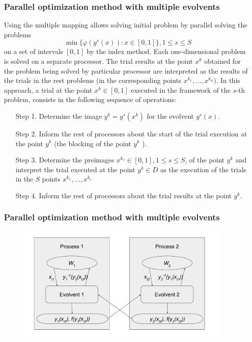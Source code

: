 \documentclass[aspectratio=1610]{beamer}
\begin{document}
\begin{frame}
  \frametitle{Parallel optimization method with multiple evolvents}
  Using the multiple mapping allows solving initial problem by parallel solving the problems
  \[
  \min\{\varphi(y^s(x)):x\in [0,1]\}, 1\leqslant s\leqslant S
  \]
  on a set of intervals $[0,1]$ by the index method. Each one-dimensional problem is solved on a
  separate processor. The trial results at the point \(x^k\) obtained for the problem being solved by
  particular processor are interpreted as the results of the trials in the rest problems (in the
  corresponding points \(x^{k_1},\dots,x^{k_S})\). In this approach, a trial at the point \(x^k \in
  [0,1]\) executed in the framework of the \(s\)-th problem, consists in the following sequence of
  operations:
  \begin{enumerate}
    \setlength{\itemindent}{.1in}
    \item[Step 1.] Determine the image \(y^k=y^s (x^k)\) for the evolvent \(y^s (x)\).
    \item[Step 2.] Inform the rest of processors about the start of the trial execution at the point \( y^k\) (the
    blocking of the point \(y^k\) ).
    \item[Step 3.] Determine the preimages \(x{}^{k_s}  \in [0,1], 1\leqslant s\leqslant S\), of the point \(y^k\) and interpret the
    trial executed at the point \(y^k \in D \) as the execution of the trials in the \(S\) points
    \(x{}^{k_1} ,\dots,x{}^{k_s} \)
    \item[Step 4.] Inform the rest of processors about the trial results at the point \(y^k\).
  \end{enumerate}
\end{frame}

\begin{frame}
  \frametitle{Parallel optimization method with multiple evolvents}
  \begin{figure}[ht]
    \includegraphics[width=0.95\textwidth]{evolvents_parallel.pdf}
  \end{figure}
\end{frame}
\end{document}
